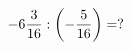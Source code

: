\documentclass[preview]{standalone}
\begin{document}
\begin{align*}
-6 { 3 \over 16 }  :  \left( - { 5 \over 16 } \right)  =  ?
\end{align*}
\end{document}
